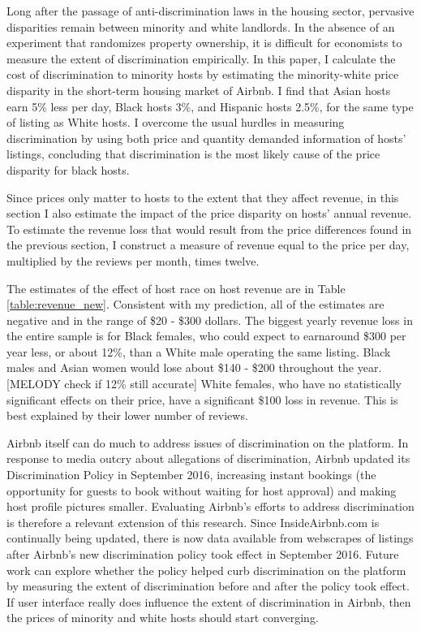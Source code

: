 
Long after the passage of anti-discrimination laws in the housing sector, pervasive disparities remain between minority and white landlords. In the absence of an experiment that randomizes property ownership, it is difficult for economists to measure the extent of discrimination empirically. In this paper, I calculate the cost of discrimination to minority hosts by estimating the minority-white price disparity in the short-term housing market of Airbnb. I find that Asian hosts earn 5\% less per day, Black hosts 3\%, and Hispanic hosts 2.5\%, for the same type of listing as White hosts. I overcome the usual hurdles in measuring discrimination by using both price and quantity demanded information of hosts' listings, concluding that discrimination is the most likely cause of the price disparity for black hosts. 

Since prices only matter to hosts to the extent that they affect revenue, in this section I also estimate the impact of the price disparity on hosts' annual revenue. To estimate the revenue loss that would result from the price differences found in the previous section, I construct a measure of revenue equal to the price per day, multiplied by the reviews per month, times twelve. 

The estimates of the effect of host race on host revenue are in Table \ref{table:revenue_new}. Consistent with my prediction, all of the estimates are negative and in the range of \$20 - \$300 dollars. The biggest yearly revenue loss in the entire sample is for Black females, who could expect to earnaround \$300 per year less, or about 12\%, than a White male operating the same listing. Black males and Asian women would lose about \$140 - \$200 throughout the year. [MELODY check if 12\% still accurate] White females, who have no statistically significant effects on their price, have a significant \$100 loss in revenue. This is best explained by their lower number of reviews. 

Airbnb itself can do much to address issues of discrimination on the platform. In response to media outcry about allegations of discrimination, Airbnb updated its Discrimination Policy in September 2016, increasing instant bookings (the opportunity for guests to book without waiting for host approval) and making host profile pictures smaller. Evaluating Airbnb's efforts to address discrimination is therefore a relevant extension of this research. Since InsideAirbnb.com is continually being updated, there is now data available from webscrapes of listings after Airbnb's new discrimination policy took effect in September 2016. Future work can explore whether the policy helped curb discrimination on the platform by measuring the extent of discrimination before and after the policy took effect. If user interface really does influence the extent of discrimination in Airbnb, then the prices of minority and white hosts should start converging. 


